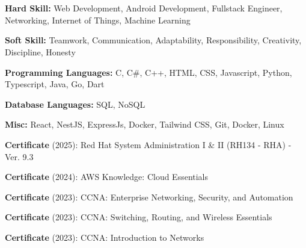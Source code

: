 \documentclass[../main.tex]{subfiles}
\begin{document}
\section{}
\begin{highlights}
    \item \textbf{Hard Skill:} Web Development, Android Development, Fullstack Engineer, Networking, Internet of Things, Machine Learning
    \item \textbf{Soft Skill:} Teamwork, Communication, Adaptability, Responsibility, Creativity, Discipline, Honesty
    \item \textbf{Programming Languages:} C, C\#, C++, HTML, CSS, Javascript, Python, Typescript, Java, Go, Dart
    \item \textbf{Database Languages:} SQL, NoSQL
    \item \textbf{Misc:} React, NestJS, ExpressJs, Docker, Tailwind CSS, Git, Docker, Linux
    \item \textbf{Certificate} (2025): Red Hat System Administration I \& II (RH134 - RHA) - Ver. 9.3
    \item \textbf{Certificate} (2024): AWS Knowledge: Cloud Essentials
    \item \textbf{Certificate} (2023): CCNA: Enterprise Networking, Security, and Automation
    \item \textbf{Certificate} (2023): CCNA: Switching, Routing, and Wireless Essentials
    \item \textbf{Certificate} (2023): CCNA: Introduction to Networks
\end{highlights}
\end{document}
